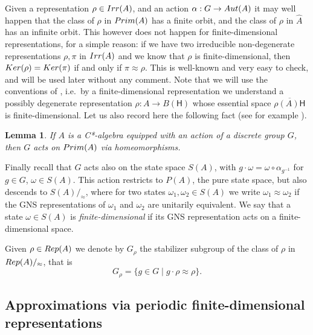 \documentclass[11 pt, leqno, hidelinks]{amsart}%
\theoremstyle{plain}
\newtheorem{lemma}[theorem]{Lemma}
\numberwithin{equation}{section}
\newcommand{\Rep}{\textup{Rep}}
\newcommand{\Irr}{\textup{Irr}}
\newcommand{\Prim}{\textup{Prim}}
\newcommand{\Ker}{\textup{Ker}}
\newcommand{\Hil}{\mathsf{H}}
\begin{document}
Given  a representation $\rho \in \Irr(A)$, and an action $\alpha: G \to \textup{Aut}(A)$ it may well happen that the class of $\rho$ in $\textup{Prim}(A)$ has a finite orbit, and the class of $\rho$ in $\hat{A}$ has an infinite orbit. This however does not happen for finite-dimensional representations, for a simple reason: if we have two irreducible non-degenerate representations $\rho,\pi$ in $\Irr (A)$ and we know that $\rho$ is finite-dimensional, then $\Ker(\rho) = \Ker(\pi)$ if and only if $\pi \approx \rho$. This is well-known and very easy to check, and will be used later without any comment. Note that  we will use the conventions of \cite{ExelLoring}, i.e.\ by a finite-dimensional representation we understand a possibly degenerate representation $\rho:A \to B(\Hil)$ whose essential space $\overline{\rho(A)\Hil}$ is finite-dimensional. Let us also record here the following fact (see for example \cite[Lemma 5.44, Remark 5.45]{DanaIan}).

\begin{lemma}\label{homeoPrim}
	If $A$ is a C*-algebra equipped with an action of a discrete group $G$, then $G$ acts on $\Prim(A)$ via homeomorphisms.
\end{lemma}





Finally recall that $G$ acts also on the state space $S(A)$, with $g \cdot \omega = \omega \circ \alpha_{g^{-1}}$ for $g \in G$, $\omega \in S(A)$. This action restricts to $P(A)$, the pure state space, but  also descends to $S(A)/_\approx$, where for two states $\omega_1, \omega_2 \in S(A)$ we write $\omega_1 \approx \omega_2$ if the GNS representations of $\omega_1$ and $\omega_2$ are unitarily equivalent. We say that a state $\omega \in S(A)$ is \emph{finite-dimensional} if its GNS representation acts on a finite-dimensional space.




Given $\rho \in \Rep(A)$ we denote by $G_{\rho}$ the stabilizer subgroup of the class of $\rho$ in $\Rep(A)/_\approx$, that is
\begin{equation}G_{\rho} = \{ g\in G \;|\; g\cdot\rho \approx\rho\}. \label{Grho}\end{equation}

\subsection{Approximations via periodic finite-dimensional representations}
\end{document}

